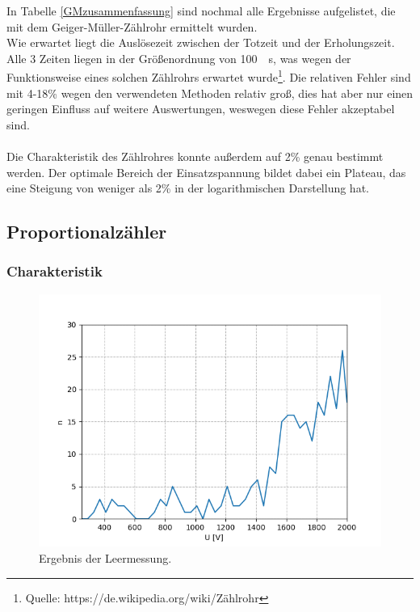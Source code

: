 \documentclass[12pt,a4paper]{article}
\begin{document}
In Tabelle \ref{GMzusammenfassung} sind nochmal alle Ergebnisse aufgelistet, die mit dem Geiger-Müller-Zählrohr ermittelt wurden.\\
Wie erwartet liegt die Auslösezeit zwischen der Totzeit und der Erholungszeit. Alle 3 Zeiten liegen in der Größenordnung von \SI{100}{\mu s}, was wegen der Funktionsweise eines solchen Zählrohrs erwartet wurde\footnote{Quelle: https://de.wikipedia.org/wiki/Zählrohr}. Die relativen Fehler sind mit 4-18\% wegen den verwendeten Methoden relativ groß, dies hat aber nur einen geringen Einfluss auf weitere Auswertungen, weswegen diese Fehler akzeptabel sind.\\
\\
Die Charakteristik des Zählrohres konnte außerdem auf 2\% genau bestimmt werden. Der optimale Bereich der Einsatzspannung bildet dabei ein Plateau, das eine Steigung von weniger als 2\% in der logarithmischen Darstellung hat. 

\newpage
\subsection{Proportionalzähler}

\subsubsection{Charakteristik}


\begin{figure}
\centering
\includegraphics[scale=0.8]{Bilder/Prop/leer.PNG}
\caption{Ergebnis der Leermessung.}
\label{fig:leer}
\end{figure}
\end{document}

